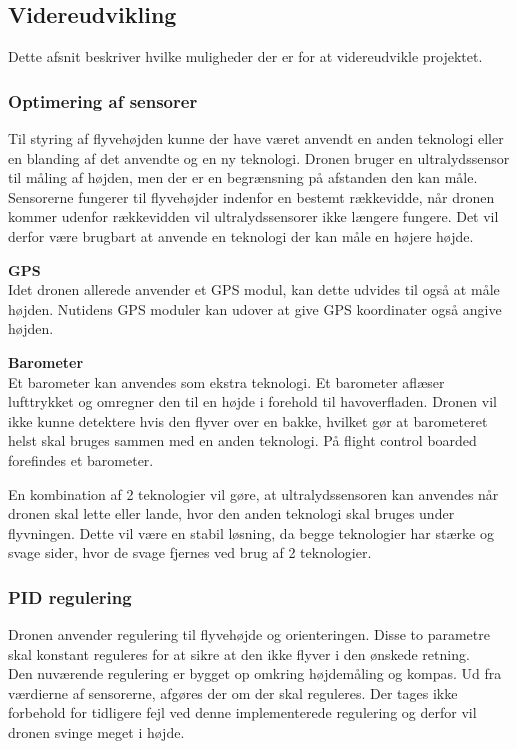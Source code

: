 \subsection{Videreudvikling}

Dette afsnit beskriver hvilke muligheder der er for at videreudvikle projektet. 

\subsubsection*{Optimering af sensorer}

Til styring af flyvehøjden kunne der have været anvendt en anden teknologi eller en blanding af det anvendte og en ny teknologi. Dronen bruger en ultralydssensor til måling af højden, men der er en begrænsning på afstanden den kan måle. Sensorerne fungerer til flyvehøjder indenfor en bestemt rækkevidde, når dronen kommer udenfor rækkevidden vil ultralydssensorer ikke længere fungere. Det vil derfor være brugbart at anvende en teknologi der kan måle en højere højde. 

\textbf{GPS}\\
Idet dronen allerede anvender et GPS modul, kan dette udvides til også at måle højden. Nutidens GPS moduler kan udover at give GPS koordinater også angive højden.

\textbf{Barometer}\\ 
Et barometer kan anvendes som ekstra teknologi. Et barometer aflæser lufttrykket og omregner den til en højde i forehold til havoverfladen. Dronen vil ikke kunne detektere hvis den flyver over en bakke, hvilket gør at barometeret helst skal bruges sammen med en anden teknologi. På flight control boarded forefindes et barometer. 


En kombination af 2 teknologier vil gøre, at ultralydssensoren kan anvendes når dronen skal lette eller lande, hvor den anden teknologi skal bruges under flyvningen. Dette vil være en stabil løsning, da begge teknologier har stærke og svage sider, hvor de svage fjernes ved brug af 2 teknologier.

\subsubsection*{PID regulering}

Dronen anvender regulering til flyvehøjde og orienteringen. Disse to parametre skal konstant reguleres for at sikre at den ikke flyver i den ønskede retning. \\
Den nuværende regulering er bygget op omkring højdemåling og kompas. Ud fra værdierne af sensorerne, afgøres der om der skal reguleres. Der tages ikke forbehold for tidligere fejl ved denne implementerede regulering og derfor vil dronen svinge meget i højde.

